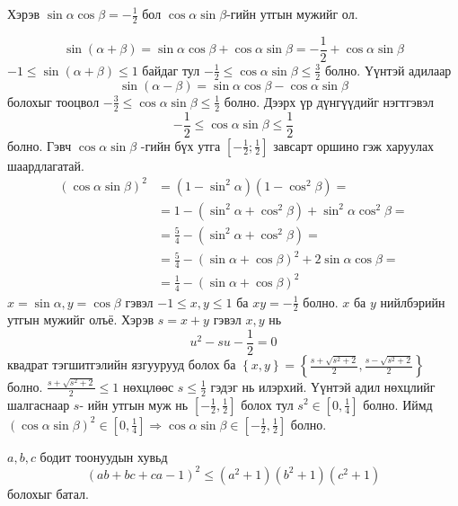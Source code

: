 \documentclass[10pt,a4paper,oneside]{book}
\begin{document}
\Problem
Хэрэв $\sin \alpha \cos \beta = -\frac{1}{2}$ бол $\cos \alpha \sin \beta$-гийн утгын мужийг ол.

\TheSolution
\begin{equation*}
\sin(\alpha + \beta) = \sin \alpha\cos \beta + \cos \alpha \sin \beta = -\frac{1}{2} + \cos \alpha \sin \beta
\end{equation*}
$-1 \leq \sin(\alpha + \beta) \leq 1$ байдаг тул $-\frac{1}{2}\leq \cos \alpha\sin \beta \leq \frac{3}{2}$ болно.
Үүнтэй адилаар
\begin{equation*}
\sin (\alpha - \beta) = \sin\alpha\cos\beta - \cos\alpha\sin \beta
\end{equation*}
болохыг тооцвол $-\frac{3}{2} \leq \cos\alpha\sin\beta \leq \frac{1}{2}$ болно. Дээрх үр дүнгүүдийг нэгтгэвэл
\begin{equation*}
-\frac{1}{2} \leq \cos\alpha\sin \beta \leq \frac{1}{2}
\end{equation*}
болно. Гэвч $\cos\alpha\sin \beta$ -гийн бүх утга $\left[-\frac{1}{2}; \frac{1}{2}\right]$ завсарт оршино гэж харуулах шаардлагатай.
\begin{align*}
(\cos \alpha\sin\beta)^2 &= (1-\sin^2\alpha)(1-\cos^2\beta) = \\
&= 1-(\sin^2\alpha + \cos^2\beta) + \sin^2 \alpha\cos^2\beta = \\
&= \frac{5}{4} - (\sin^2\alpha + \cos^2\beta) = \\
&= \frac{5}{4} - (\sin\alpha + \cos\beta)^2 + 2\sin\alpha\cos\beta = \\
&= \frac{1}{4} - (\sin\alpha + \cos\beta)^2
\end{align*}
$x=\sin \alpha, y = \cos \beta$ гэвэл $-1\leq x, y \leq 1$ ба $xy=-\frac{1}{2}$ болно. $x$ ба $y$ нийлбэрийн утгын мужийг олъё. Хэрэв $s=x+y$ гэвэл $x, y$ нь
\begin{equation*}
u^2 - su - \frac{1}{2} = 0
\end{equation*}
квадрат тэгшитгэлийн язгуурууд болох ба $\left\lbrace x, y\right\rbrace = \left\lbrace\frac{s+\sqrt{s^2 + 2}}{2}, \frac{s-\sqrt{s^2 + 2}}{2}\right\rbrace$ болно. $\frac{s+\sqrt{s^2 + 2}}{2} \leq 1$ нөхцлөөс $s \leq \frac{1}{2}$ гэдэг нь илэрхий. Үүнтэй адил нөхцлийг шалгаснаар $s$- ийн утгын муж нь $\left[-\frac{1}{2}, \frac{1}{2}\right]$ болох тул $s^2 \in \left[0, \frac{1}{4}\right]$ болно. Иймд $(\cos \alpha\sin \beta)^2 \in \left[0, \frac{1}{4}\right] \Rightarrow \cos\alpha\sin\beta \in \left[ -\frac{1}{2}, \frac{1}{2}\right]$ болно.

\Problem
$a, b, c$ бодит тоонуудын хувьд
\begin{equation*}
(ab+bc+ca -1)^2 \leq (a^2 +1)(b^2 + 1)(c^2 + 1)
\end{equation*}
болохыг батал.
\end{document}
